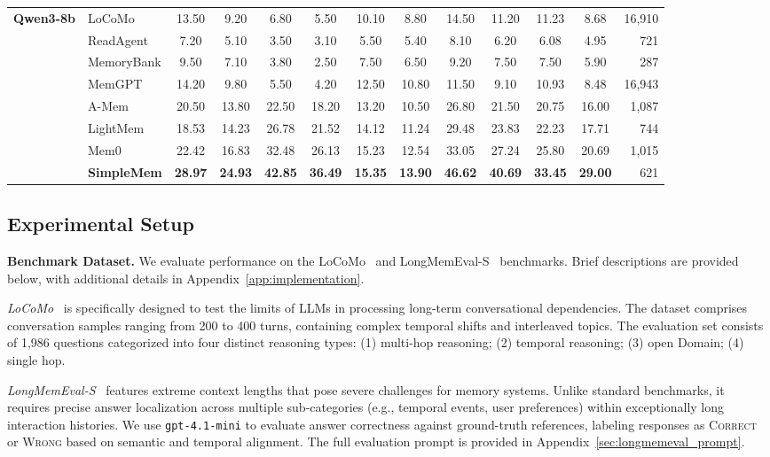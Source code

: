 \documentclass{article}
\newcommand{\ours}{SimpleMem}
\theoremstyle{plain}
\theoremstyle{definition}
\theoremstyle{remark}
\begin{document}
\begin{table}[t]
{\begin{tabular}{l|l|cc|cc|cc|cc|cc|r}
\multirow{8}{*}{\textbf{Qwen3-8b}} 
 & LoCoMo & 13.50 & 9.20 & 6.80 & 5.50 & 10.10 & 8.80 & 14.50 & 11.20 & 11.23 & 8.68 & 16,910 \\
 & ReadAgent & 7.20 & 5.10 & 3.50 & 3.10 & 5.50 & 5.40 & 8.10 & 6.20 & 6.08 & 4.95 & 721 \\
 & MemoryBank & 9.50 & 7.10 & 3.80 & 2.50 & 7.50 & 6.50 & 9.20 & 7.50 & 7.50 & 5.90 & 287 \\
 & MemGPT & 14.20 & 9.80 & 5.50 & 4.20 & 12.50 & 10.80 & 11.50 & 9.10 & 10.93 & 8.48 & 16,943 \\
 & A-Mem & 20.50 & 13.80 & 22.50 & 18.20 & 13.20 & 10.50 & 26.80 & 21.50 & 20.75 & 16.00 & 1,087 \\
 & LightMem & 18.53 & 14.23 & 26.78 & 21.52 & 14.12 & 11.24 & 29.48 & 23.83 & 22.23 & 17.71 & 744 \\
 & Mem0 & 22.42 & 16.83 & 32.48 & 26.13 & 15.23 & 12.54 & 33.05 & 27.24 & 25.80  & 20.69  & 1,015 \\
 \rowcolor{gray!10} & \textbf{\ours{}} & \textbf{28.97} & \textbf{24.93} & \textbf{42.85} & \textbf{36.49} & \textbf{15.35} & \textbf{13.90} & \textbf{46.62} & \textbf{40.69} & \textbf{33.45}  & \textbf{29.00} & 621 \\
\bottomrule
\end{tabular}
}
\vspace{-1.5em}
\end{table}




\subsection{Experimental Setup}
\noindent \textbf{Benchmark Dataset.}
We evaluate performance on the LoCoMo~\cite{maharana2024eval} and LongMemEval-S~\cite{wu2024longmemeval} benchmarks. Brief descriptions are provided below, with additional details in Appendix~\ref{app:implementation}.

\textit{LoCoMo}~\cite{maharana2024eval} is specifically designed to test the limits of LLMs in processing long-term conversational dependencies.
The dataset comprises conversation samples ranging from 200 to 400 turns, containing complex temporal shifts and interleaved topics. The evaluation set consists of 1,986 questions categorized into four distinct reasoning types:
(1) multi-hop reasoning; (2) temporal reasoning; (3) open Domain; (4) single hop.

\textit{LongMemEval-S}~\cite{wu2024longmemeval} features extreme context lengths that pose severe challenges for memory systems. Unlike standard benchmarks, it requires precise answer localization across multiple sub-categories (e.g., temporal events, user preferences) within exceptionally long interaction histories. We use \texttt{gpt-4.1-mini} to evaluate answer correctness against ground-truth references, labeling responses as \textsc{Correct} or \textsc{Wrong} based on semantic and temporal alignment. The full evaluation prompt is provided in Appendix~\ref{sec:longmemeval_prompt}.
\end{document}
